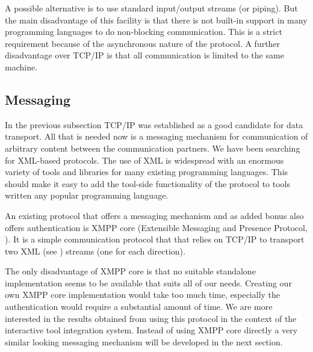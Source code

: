 \documentclass{article}
\begin{document}
   A possible alternative is to use standard input/output streams (or piping).
   But the main disadvantage of this facility is that there is not built-in
   support in many programming languages to do non-blocking communication. This
   is a strict requirement because of the asynchronous nature of the protocol.
   A further disadvantage over TCP/IP is that all communication is limited to
   the same machine.


  \subsection{Messaging}

   In the previous subsection TCP/IP was established as a good candidate for
   data transport. All that is needed now is a messaging mechanism for
   communication of arbitrary content between the communication partners. We
   have been searching for XML-based protocols. The use of XML is widespread
   with an enormous variety of tools and libraries for many existing
   programming languages. This should make it easy to add the tool-side
   functionality of the protocol to tools written any popular programming
   language.
   
   An existing protocol that offers a messaging mechanism and as added bonus
   also offers authentication is XMPP core (Extensible Messaging and Presence
   Protocol, \cite{rfc3920}).  It is a simple communication protocol that that
   relies on TCP/IP to transport two XML (see \cite{Sperberg-McQueen:06:EML})
   streams (one for each direction).

   The only disadvantage of XMPP core is that no suitable standalone
   implementation seems to be available that suits all of our needs. Creating
   our own XMPP core implementation would take too much time, especially the
   authentication would require a substantial amount of time. We are more
   interested in the results obtained from using this protocol in the context
   of the interactive tool integration system. Instead of using XMPP core
   directly a very similar looking messaging mechanism will be developed in the
   next section.
\end{document}

